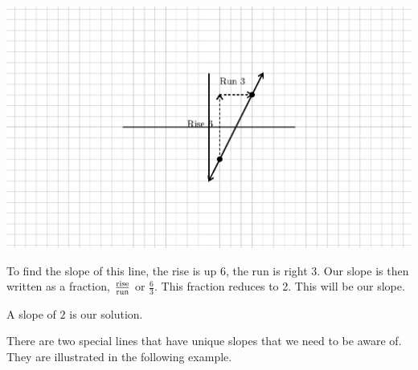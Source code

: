 \begin{example}\label{Lin47}
~\end{example}  
 \begin{multicols}{2}
    \includegraphics[scale=.9,bb = 115 65 310 190, clip=true]{II_1_3c-2.eps}
    
    To find the slope of this line, the rise is up 6, the run is right 3.\pp
		Our slope is then written as a fraction, $\frac{\operatorname{rise}}{\operatorname{run}}$ or
    $\frac{6}{3}$.\pp
		This fraction reduces to 2.  This will be our slope.
		  \end{multicols}
\begin{center}
A slope of $2$ is our solution.
\end{center}

 There are two special lines that have unique slopes that we need to be aware
of. They are illustrated in the following example.

